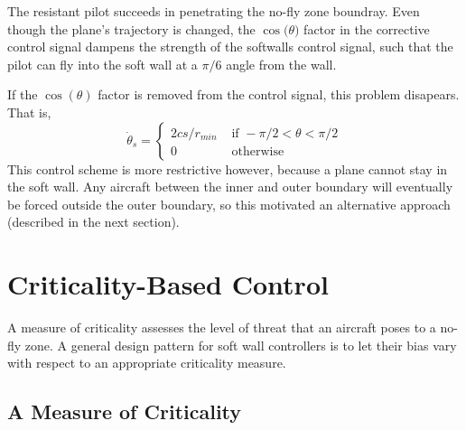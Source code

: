 \documentclass[11pt]{article}
\begin{document}
The resistant pilot succeeds in penetrating the no-fly zone boundray.
Even though the plane's trajectory is changed, the $\cos{\!(\theta})$ factor
in the corrective control signal dampens the strength of the softwalls
control signal, such that the pilot can fly into the soft wall at a
$\pi/6$ angle from the wall.

If the $\cos{\!(\theta)}$ factor is removed from the control signal, this
problem disapears.  That is,
\[
\dot{\theta}_s = \left \{
\begin{array}{ll}
2 c s/r_{min}& \mbox{ if } -\pi / 2 < \theta < \pi / 2 \\
0 & \mbox{ otherwise}
\end{array}
\right .
\]
This control scheme is more restrictive however, because a plane
cannot stay in the soft wall.  Any aircraft between the inner and outer
boundary will eventually be forced outside the outer boundary, so this
motivated an alternative approach (described in the next section).

\section{Criticality-Based Control}

A measure of criticality assesses the level of threat that an aircraft poses to
a no-fly zone. A general design pattern for soft wall controllers is to let their
bias vary with respect to an appropriate criticality measure.

\subsection{A Measure of Criticality}
\end{document}

